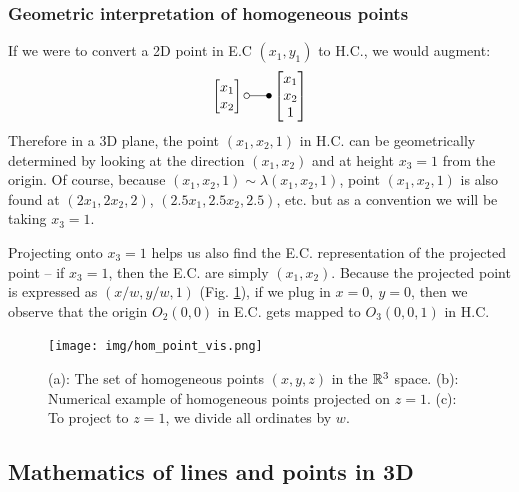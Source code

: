 \documentclass[a4paper]{article}
\begin{document}
\subsubsection{Geometric interpretation of homogeneous points}

If we were to convert a 2D point in E.C $(x_1, y_1)$ to H.C., we would augment:
\[
\begin{bmatrix}
x_1 \\ x_2    
\end{bmatrix}
\laplace
\begin{bmatrix}
x_1 \\ x_2  \\ 1
\end{bmatrix}
\]
Therefore in a 3D plane, the point $(x_1,x_2,1)$ in H.C. can be geometrically determined by looking at the direction $(x_1, x_2)$ and at height $x_3=1$ from the origin. Of course, because $(x_1,x_2,1) \sim \lambda(x_1,x_2,1)$, point $(x_1,x_2,1)$ is also found at $(2x_1,2x_2,2)$, $(2.5x_1,2.5x_2,2.5)$, etc. but as a convention we will be taking $x_3=1$.

Projecting onto $x_3 = 1$ helps us also find the E.C. representation of the projected point -- if $x_3=1$, then the E.C. are simply $(x_1, x_2)$. Because the projected point is expressed as $(x/w, y/w, 1)$ (Fig. \ref{fig:hc_vis_in_R3}), if we plug in $x=0,\ y=0$, then we observe that the origin $O_2(0,0)$ in E.C. gets mapped to $O_3(0,0,1)$ in H.C.
\begin{figure}[H]
    \centering
    \texttt{[image: img/hom\_point\_vis.png]}
    \caption{(a): The set of homogeneous points $(x,y,z)$ in the $\mathbb{R}^3$ space. (b): Numerical example of homogeneous points projected on $z=1$. (c): To project to $z=1$, we divide all ordinates by $w$.}
    \label{fig:hc_vis_in_R3}
\end{figure}



\subsection{Mathematics of lines and points in 3D}
\end{document}
